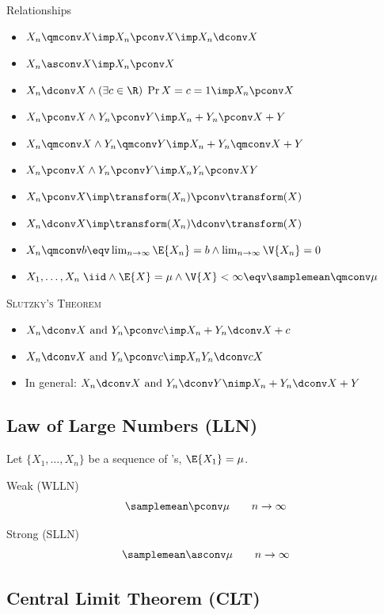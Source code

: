 \documentclass[landscape]{article}
\begin{document}
\begin{multicols*}{2}
Relationships
\begin{itemize}
  \item $X_n \qmconv X \imp X_n \pconv X \imp X_n \dconv X$
  \item $X_n \asconv X \imp X_n \pconv X$
  \item $X_n \dconv X \wedge (\exists c \in \R) \; \Pr{X=c} = 1
    \imp X_n \pconv X$
  \item $X_n \pconv X \wedge Y_n \pconv Y
    \imp X_n + Y_n \pconv X + Y$
  \item $X_n \qmconv X \wedge Y_n \qmconv Y
    \imp X_n + Y_n \qmconv X + Y$
  \item $X_n \pconv X \wedge Y_n \pconv Y
    \imp X_nY_n \pconv XY$
  \item $X_n \pconv X \imp \transform(X_n) \pconv \transform(X)$
  \item $X_n \dconv X \imp \transform(X_n) \dconv \transform(X)$
  \item $X_n \qmconv b \eqv \lim_{n\to\infty} \E{X_n}=b
    \wedge \lim_{n\to\infty} \V{X_n} = 0$
  \item $X_1,\dots,X_n\; \iid \wedge \E{X}=\mu \wedge \V{X}<\infty
    \eqv \samplemean \qmconv \mu$
\end{itemize}

\textsc{Slutzky's Theorem}
\begin{itemize}
  \item $X_n \dconv X \text{ and } Y_n \pconv c
    \imp X_n + Y_n \dconv X + c$
  \item $X_n \dconv X \text{ and } Y_n \pconv c
    \imp X_nY_n \dconv cX$
  \item In general: $X_n \dconv X \text{ and } Y_n \dconv Y
    \nimp X_n + Y_n \dconv X + Y$
\end{itemize}

\subsection{Law of Large Numbers (LLN)}

Let $\{X_1,\ldots,X_n\}$ be a sequence of \iid \rv's, $\E{X_1}=\mu$.

Weak (WLLN)
\[\samplemean \pconv \mu \qquad n\to\infty\]

Strong (SLLN)
\[\samplemean \asconv \mu \qquad n\to\infty\]

\subsection{Central Limit Theorem (CLT)}


\end{multicols*}
\end{document}
